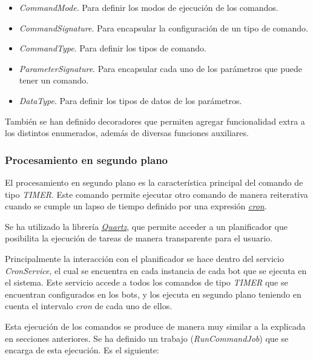 \begin{itemize}
	\item \textit{CommandMode}. Para definir los modos de ejecución de los comandos.
	\item \textit{CommandSignature}. Para encapsular la configuración de un tipo de comando.
	\item \textit{CommandType}. Para definir los tipos de comando.
	\item \textit{ParameterSignature}. Para encapsular cada uno de los parámetros que puede tener un comando.
	\item \textit{DataType}. Para definir los tipos de datos de los parámetros.
\end{itemize}

También se han definido decoradores que permiten agregar funcionalidad extra a los distintos enumerados, además de diversas funciones auxiliares.


\subsubsection{Procesamiento en segundo plano}

El procesamiento en segundo plano es la característica principal del comando de tipo \textit{TIMER}. Este comando permite ejecutar otro comando de manera reiterativa cuando se cumple un lapso de tiempo definido por una expresión \href{https://docs.oracle.com/cd/E12058_01/doc/doc.1014/e12030/cron_expressions.htm}{\textit{cron}}.

Se ha utilizado la librería \href{https://www.quartz-scheduler.net/}{\textit{Quartz}}, que permite acceder a un planificador que posibilita la ejecución de tareas de manera transparente para el usuario.

Principalmente la interacción con el planificador se hace dentro del servicio \textit{CronService}, el cual se encuentra en cada instancia de cada bot que se ejecuta en el sistema. Este servicio accede a todos los comandos de tipo \textit{TIMER} que se encuentran configurados en los bots, y los ejecuta en segundo plano teniendo en cuenta el intervalo \textit{cron} de cada uno de ellos.

Esta ejecución de los comandos se produce de manera muy similar a la explicada en secciones anteriores. Se ha definido un trabajo (\textit{RunCommandJob}) que se encarga de esta ejecución. Es el siguiente:

